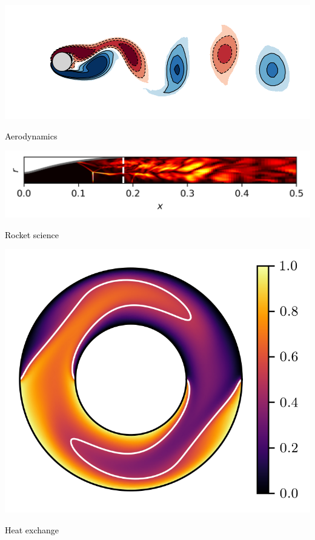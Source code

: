 \documentclass[aspectratio=169]{beamer}
\begin{document}
{

\begin{frame}%
  \vfill
  \begin{minipage}{.68\textwidth}
    \centering
    \includegraphics[width=\textwidth]{snapshot_re125_0}
    
    {\small \textcolor{black}{Aerodynamics}}

    \bigskip
    
    \includegraphics[width=\textwidth]{tic_m=1_fourier_mode_snapshot}

    {\small \textcolor{black}{Rocket science}}
  \end{minipage}%
  \hfill
  \begin{minipage}{.28\textwidth}
    \centering
    \includegraphics[width=\textwidth]{temperature_field_00000}

    {\small \textcolor{black}{Heat exchange}}
  \end{minipage}
  
  \vfill
\end{frame}
}
\end{document}
